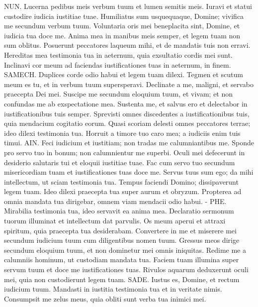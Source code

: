 \begin{biblechapter}
\verse NUN. Lucerna pedibus meis verbum tuum et lumen semitis meis. 
\verse Iuravi et statui custodire iudicia iustitiae tuae. 
\verse Humiliatus sum usquequaque, Domine; vivifica me secundum verbum tuum. 
\verse Voluntaria oris mei beneplacita sint, Domine, et iudicia tua doce me. 
\verse Anima mea in manibus meis semper, et legem tuam non sum oblitus. 
\verse Posuerunt peccatores laqueum mihi, et de mandatis tuis non erravi. 
\verse Hereditas mea testimonia tua in aeternum, quia exsultatio cordis mei sunt. 
\verse Inclinavi cor meum ad faciendas iustificationes tuas in aeternum, in finem. 
\verse SAMECH. Duplices corde odio habui et legem tuam dilexi. 
\verse Tegmen et scutum meum es tu, et in verbum tuum supersperavi. 
\verse Declinate a me, maligni, et servabo praecepta Dei mei. 
\verse Suscipe me secundum eloquium tuum, et vivam; et non confundas me ab exspectatione mea. 
\verse Sustenta me, et salvus ero et delectabor in iustificationibus tuis semper. 
\verse Sprevisti omnes discedentes a iustificationibus tuis, quia mendacium cogitatio eorum. 
\verse Quasi scoriam delesti omnes peccatores terrae; ideo dilexi testimonia tua. 
\verse Horruit a timore tuo caro mea; a iudiciis enim tuis timui. 
\verse AIN. Feci iudicium et iustitiam; non tradas me calumniantibus me. 
\verse Sponde pro servo tuo in bonum; non calumnientur me superbi. 
\verse Oculi mei defecerunt in desiderio salutaris tui et eloquii iustitiae tuae. 
\verse Fac cum servo tuo secundum misericordiam tuam et iustificationes tuas doce me. 
\verse Servus tuus sum ego; da mihi intellectum, ut sciam testimonia tua. 
\verse Tempus faciendi Domino; dissipaverunt legem tuam. 
\verse Ideo dilexi praecepta tua super aurum et obryzum. 
\verse Propterea ad omnia mandata tua dirigebar, omnem viam mendacii odio habui. - 
\verse PHE. Mirabilia testimonia tua, ideo servavit ea anima mea. 
\verse Declaratio sermonum tuorum illuminat et intellectum dat parvulis. 
\verse Os meum aperui et attraxi spiritum, quia praecepta tua desiderabam. 
\verse Convertere in me et miserere mei secundum iudicium tuum cum diligentibus nomen tuum. 
\verse Gressus meos dirige secundum eloquium tuum, et non dominetur mei omnis iniquitas. 
\verse Redime me a calumniis hominum, ut custodiam mandata tua. 
\verse Faciem tuam illumina super servum tuum et doce me iustificationes tuas. 
\verse Rivulos aquarum deduxerunt oculi mei, quia non custodierunt legem tuam. 
\verse SADE. Iustus es, Domine, et rectum iudicium tuum. 
\verse Mandasti in iustitia testimonia tua et in veritate nimis. 
\verse Consumpsit me zelus meus, quia obliti sunt verba tua inimici mei. 

\end{biblechapter}
